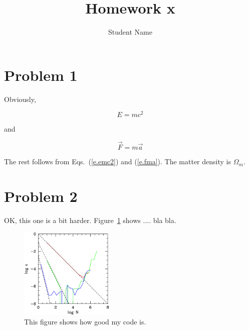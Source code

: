 
\pagestyle{plain}
\baselineskip 18pt
\textwidth 6.5in
\textheight 7.8in
\oddsidemargin 0.1in
\evensidemargin 0.1in
\topmargin 0.3in
\parindent 0pt

\newcommand{\beq}{\begin{equation}}
  \newcommand{\eeq}{\end{equation}}
\def\om{\Omega_m}




\title{Homework x}
\author{Student Name}
\maketitle

\section{Problem 1}
\label{s.prob1}

Obviously,

\beq
E=m c^2
\label{e.emc2}
\eeq

and

\beq
\vec{F} = m \vec{a}
\label{e.fma}
\eeq

The rest follows from Eqs.~(\ref{e.emc2}) and (\ref{e.fma}). The matter
density is $\om$. 

\section{Problem 2}


OK, this one is a bit harder. Figure~\ref{figeps} shows .... bla bla.

\begin{figure}[h]
\begin{center}
\includegraphics[width=0.4\textwidth]{figure1.ps}
\caption{This figure shows how good my code is.}
\label{figeps}
\end{center}
\end{figure}




